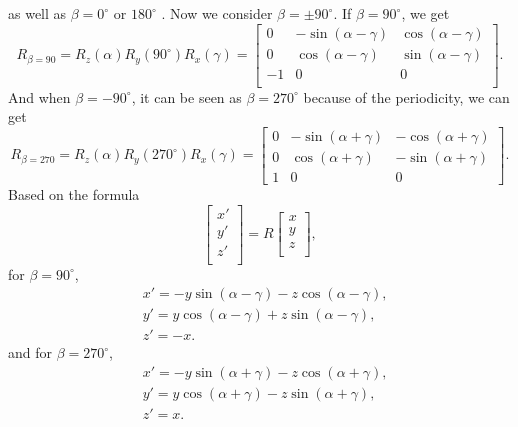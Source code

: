 as well as $\beta=0^{\circ}$ or $180^{\circ}$ \cite{r17}. Now we consider $\beta=\pm90^{\circ}$. If $\beta=90^{\circ}$, we get 
\begin{equation}
R_{\beta=90}=R_{z}(\alpha)R_{y}(90^{\circ})R_{x}(\gamma)=
\begin{bmatrix}
0&-\sin(\alpha-\gamma)&\cos(\alpha-\gamma)\\
0&\cos(\alpha-\gamma)&\sin(\alpha-\gamma)\\
         -1&                              0&0\\
\end{bmatrix}.
\end{equation}
And when $\beta=-90^{\circ}$, it can be seen as $\beta=270^{\circ}$ because of the periodicity, we can get 
\begin{equation}
R_{\beta=270}=R_{z}(\alpha)R_{y}(270^{\circ})R_{x}(\gamma)=
\begin{bmatrix}
0&-\sin(\alpha+\gamma)&-\cos(\alpha+\gamma)\\
0&\cos(\alpha+\gamma)&-\sin(\alpha+\gamma)\\
1&                               0&0
\end{bmatrix}.
\end{equation}
Based on the formula
\begin{equation}
\begin{bmatrix}
x'\\
y'\\
z'\\
\end{bmatrix}
=R
\begin{bmatrix}
x\\
y\\
z\\
\end{bmatrix},
\end{equation}
for $\beta=90^{\circ}$,
\begin{equation}
\begin{aligned}
&x'=-y\sin(\alpha-\gamma)-z\cos(\alpha-\gamma), \\
&y'=y\cos(\alpha-\gamma)+z\sin(\alpha-\gamma), \\
&z'=-x. 
\end{aligned}
\end{equation}
and for $\beta=270^{\circ}$, 
\begin{equation}
\begin{aligned}
&x'=-y\sin(\alpha+\gamma)-z\cos(\alpha+\gamma), \\
&y'=y\cos(\alpha+\gamma)-z\sin(\alpha+\gamma), \\
&z'=x.
\end{aligned}
\end{equation}
